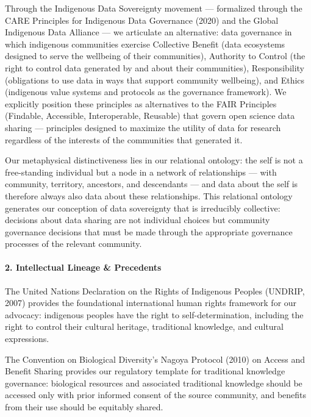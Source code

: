 Through the Indigenous Data Sovereignty movement --- formalized through
the CARE Principles for Indigenous Data Governance (2020) and the Global
Indigenous Data Alliance --- we articulate an alternative: data
governance in which indigenous communities exercise Collective Benefit
(data ecosystems designed to serve the wellbeing of their communities),
Authority to Control (the right to control data generated by and about
their communities), Responsibility (obligations to use data in ways that
support community wellbeing), and Ethics (indigenous value systems and
protocols as the governance framework). We explicitly position these
principles as alternatives to the FAIR Principles (Findable, Accessible,
Interoperable, Reusable) that govern open science data sharing ---
principles designed to maximize the utility of data for research
regardless of the interests of the communities that generated it.

Our metaphysical distinctiveness lies in our relational ontology: the
self is not a free-standing individual but a node in a network of
relationships --- with community, territory, ancestors, and descendants
--- and data about the self is therefore always also data about these
relationships. This relational ontology generates our conception of data
sovereignty that is irreducibly collective: decisions about data sharing
are not individual choices but community governance decisions that must
be made through the appropriate governance processes of the relevant
community.

\paragraph{2. Intellectual Lineage \&
Precedents}\label{intellectual-lineage-precedents-45}

The United Nations Declaration on the Rights of Indigenous Peoples
(UNDRIP, 2007) provides the foundational international human rights
framework for our advocacy: indigenous peoples have the right to
self-determination, including the right to control their cultural
heritage, traditional knowledge, and cultural expressions.

The Convention on Biological Diversity's Nagoya Protocol (2010) on
Access and Benefit Sharing provides our regulatory template for
traditional knowledge governance: biological resources and associated
traditional knowledge should be accessed only with prior informed
consent of the source community, and benefits from their use should be
equitably shared.

